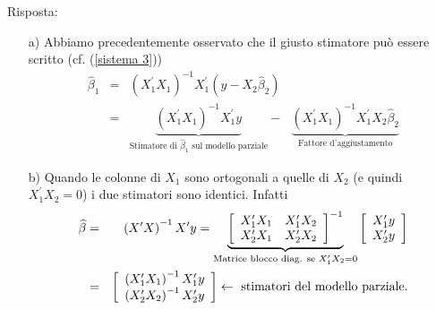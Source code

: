 \documentclass[a4paper]{report}
\theoremstyle{remark}
\begin{document}
\noindent Risposta:

\begin{enumerate}
\item[a)] Abbiamo precedentemente osservato che il giusto stimatore pu\`{o}
essere scritto (cf. (\ref{sistema 3}))%
\begin{eqnarray*}
\widehat{\beta }_{1} &=&\left( X_{1}^{\prime }X_{1}\right)
^{-1}X_{1}^{\prime }\left( y-X_{2}\widehat{\beta }_{2}\right) \\
&=&\underset{\text{Stimatore di }\widehat{\beta }_{1}\text{\ sul modello
parziale}}{\underbrace{\left( X_{1}^{\prime }X_{1}\right) ^{-1}X_{1}^{\prime
}y}}-\ \ \ \underset{\text{Fattore d'aggiustamento}}{\underbrace{\left(
X_{1}^{\prime }X_{1}\right) ^{-1}X_{1}^{\prime }X_{2}\widehat{\beta }_{2}}}
\end{eqnarray*}

\item[b)] Quando le colonne di $X_{1}$ sono ortogonali a quelle di $X_{2}$
(e quindi $X_{1}^{\prime }X_{2}=0$) i due stimatori sono identici. Infatti 
\begin{eqnarray*}
\widehat{\beta } &=&\left( X^{\prime }X\right) ^{-1}X^{\prime }y=\underset{%
\text{Matrice blocco diag. se }X_{1}^{\prime }X_{2}=0}{\underbrace{\left[ 
\begin{array}{cc}
X_{1}^{\prime }X_{1} & X_{1}^{\prime }X_{2} \\ 
X_{2}^{\prime }X_{1} & X_{2}^{\prime }X_{2}%
\end{array}%
\right] ^{-1}}}\left[ 
\begin{array}{c}
X_{1}^{\prime }y \\ 
X_{2}^{\prime }y%
\end{array}%
\right] \\
&=&\left[ 
\begin{array}{c}
\left( X_{1}^{\prime }X_{1}\right) ^{-1}X_{1}^{\prime }y \\ 
\left( X_{2}^{\prime }X_{2}\right) ^{-1}X_{2}^{\prime }y%
\end{array}%
\right] \leftarrow \text{ stimatori del modello parziale.}
\end{eqnarray*}
\end{enumerate}
\end{document}
